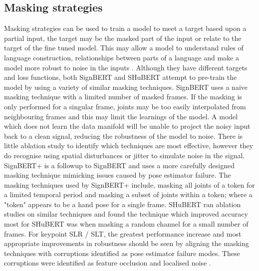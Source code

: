 \documentclass{article}
\begin{document}
\subsection{Masking strategies}
Masking strategies can be used to train a model to meet a target based upon a partial input, the target may be the masked part of the input or relate to the target of the fine tuned model. This may allow a model to understand rules of language construction, relationships between parts of a language and make a model more robust to noise in the inputs \cite{hsu_hubert_2021} \cite{baevski_wav2vec_2020} \cite{vincent_extracting_2008}. Although they have different targets and loss functions, both SignBERT and SHuBERT attempt to pre-train the model by using a variety of similar masking techniques. SignBERT uses a naive masking technique with a limited number of masked frames. If the masking is only performed for a singular frame, joints may be too easily interpolated from neighbouring frames and this may limit the learnings of the model. A model which does not learn the data manifold will be unable to project the noisy input back to a clean signal, reducing the robustness of the model to noise. There is little ablation study to identify which techniques are most effective, however they do recognise using spatial disturbances or jitter to simulate noise in the signal. SignBERT+ is a followup to SignBERT and uses a more carefully designed masking technique mimicking issues caused by pose estimator failure. The masking techniques used by SignBERT+ include, masking all joints of a token for a limited temporal period and masking a subset of joints within a token; where a "token" appears to be a hand pose for a single frame. SHuBERT ran ablation studies on similar techniques and found the technique which improved accuracy most for SHuBERT was when masking a random channel for a small number of frames.  For keypoint SLR / SLT, the greatest performance increase and most appropriate improvements in robustness should be seen by aligning the masking techniques with corruptions identified as pose estimator failure modes. These corruptions were identified as feature occlusion and localised noise \cite{moryossef_evaluating_2021} \cite{hu_signbert_2023} \cite{jiang_rtmpose_2023}.
\end{document}
